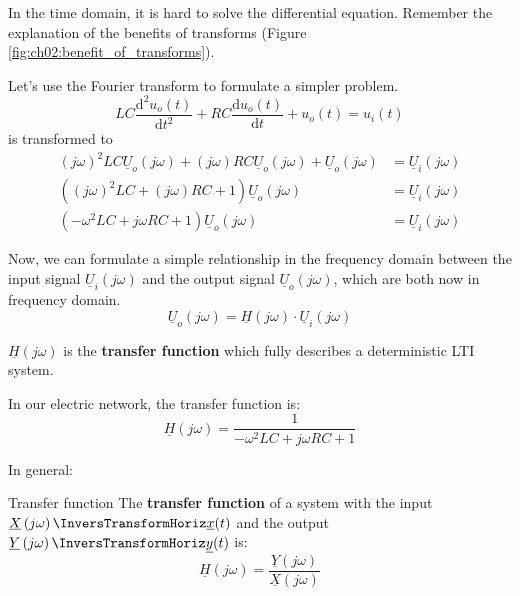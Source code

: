 \begin{refsection}
In the time domain, it is hard to solve the differential equation. Remember the explanation of the benefits of transforms (Figure \ref{fig:ch02:benefit_of_transforms}).

Let's use the Fourier transform to formulate a simpler problem.
\begin{equation*}
	L C \frac{\mathrm{d}^2 u_o(t)}{\mathrm{d} t^2} + R C \frac{\mathrm{d} u_o(t)}{\mathrm{d} t} + u_o(t) = u_i(t)
\end{equation*}
is transformed to
\begin{equation}
	\begin{split}
		\left(j \omega\right)^2 L C \underline{U}_o\left(j \omega\right) + \left(j \omega\right) R C \underline{U}_o\left(j \omega\right) + \underline{U}_o\left(j \omega\right) &= \underline{U}_i\left(j \omega\right) \\
		\left(\left(j \omega\right)^2 L C + \left(j \omega\right) R C + 1\right) \underline{U}_o\left(j \omega\right) &= \underline{U}_i\left(j \omega\right) \\
		\left(- \omega^2 L C + j \omega R C + 1\right) \underline{U}_o\left(j \omega\right) &= \underline{U}_i\left(j \omega\right)
	\end{split}
\end{equation}

Now, we can formulate a simple relationship in the frequency domain between the input signal $\underline{U}_i\left(j \omega\right)$ and the output signal $\underline{U}_o\left(j \omega\right)$, which are both now in frequency domain.
\begin{equation}
	\underline{U}_o\left(j \omega\right) = \underline{H} \left(j \omega\right) \cdot \underline{U}_i\left(j \omega\right)
\end{equation}

$\underline{H} \left(j \omega\right)$ is the  \textbf{transfer function} which fully describes a deterministic \ac{LTI} system. 

In our electric network, the transfer function is:
\begin{equation}
	\underline{H} \left(j \omega\right) = \frac{1}{- \omega^2 L C + j \omega R C + 1}
\end{equation}

In general:
\begin{definition}{Transfer function}
	The  \textbf{transfer function} of a system with the input $\underline{X}\left(j \omega\right) \InversTransformHoriz \underline{x}(t)$ and the output $\underline{Y}\left(j \omega\right) \InversTransformHoriz \underline{y}(t)$ is:
	\begin{equation}
		\underline{H} \left(j \omega\right) = \frac{\underline{Y}\left(j \omega\right)}{\underline{X}\left(j \omega\right)}
		\label{eq:ch02:tranfer_func}
	\end{equation}
\end{definition}


\end{refsection}
